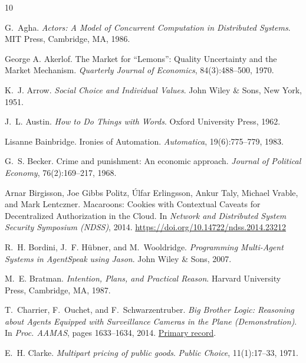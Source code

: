\documentclass[11pt,a4paper]{article}
\begin{document}

\begin{thebibliography}{10}

G.~Agha.
\newblock \emph{Actors: A Model of Concurrent Computation in Distributed Systems}.
\newblock MIT Press, Cambridge, MA, 1986.

George A. Akerlof.
\newblock The Market for ``Lemons'': Quality Uncertainty and the Market Mechanism.
\newblock \textit{Quarterly Journal of Economics}, 84(3):488--500, 1970.

K.~J. Arrow.
\newblock \emph{Social Choice and Individual Values}.
\newblock John Wiley \& Sons, New York, 1951.

J.~L. Austin.
\newblock \emph{How to Do Things with Words}.
\newblock Oxford University Press, 1962.

Lisanne Bainbridge.
\newblock Ironies of Automation.
\newblock \textit{Automatica}, 19(6):775--779, 1983.

G.~S. Becker.
\newblock Crime and punishment: An economic approach.
\newblock \emph{Journal of Political Economy}, 76(2):169--217, 1968.

Arnar Birgisson, Joe Gibbs Politz, Úlfar Erlingsson, Ankur Taly, Michael Vrable, and Mark Lentczner.
\newblock Macaroons: Cookies with Contextual Caveats for Decentralized Authorization in the Cloud.
\newblock In \textit{Network and Distributed System Security Symposium (NDSS)}, 2014.
\newblock \url{https://doi.org/10.14722/ndss.2014.23212}

R.~H. Bordini, J.~F. H{\"u}bner, and M.~Wooldridge.
\newblock \emph{Programming Multi-Agent Systems in AgentSpeak using Jason}.
\newblock John Wiley \& Sons, 2007.

M.~E. Bratman.
\newblock \emph{Intention, Plans, and Practical Reason}.
\newblock Harvard University Press, Cambridge, MA, 1987.

T.~Charrier, F.~Ouchet, and F.~Schwarzentruber.
\newblock \emph{Big Brother Logic: Reasoning about Agents Equipped with Surveillance Cameras in the Plane (Demonstration)}.
\newblock In \emph{Proc. AAMAS}, pages 1633--1634, 2014.
\newblock \href{https://aamas.csc.liv.ac.uk/Proceedings/aamas2014/aamas/p1633.pdf}{Primary record}.

E.~H. Clarke.
\newblock \emph{Multipart pricing of public goods}.
\newblock \emph{Public Choice}, 11(1):17--33, 1971.


\end{thebibliography}
\end{document}
